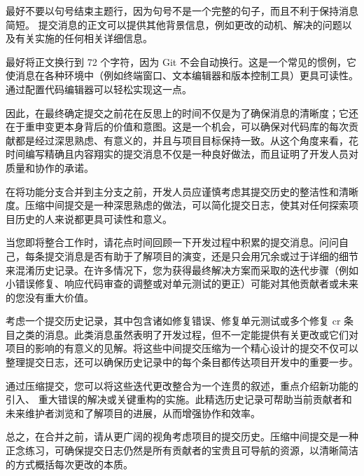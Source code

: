 最好不要以句号结束主题行，因为句号不是一个完整的句子，而且不利于保持消息简短。
提交消息的正文可以提供其他背景信息，例如更改的动机、解决的问题以及有关实施的任何相关详细信息。

最好将正文换行到 72 个字符，因为 Git 不会自动换行。这是一个常见的惯例，它使消息在各种环境中（例如终端窗口、文本编辑器和版本控制工具）更具可读性。通过配置代码编辑器可以轻松实现这一点。

因此，在最终确定提交之前花在反思上的时间不仅是为了确保消息的清晰度；它还在于重申变更本身背后的价值和意图。这是一个机会，可以确保对代码库的每次贡献都是经过深思熟虑、有意义的，并且与项目目标保持一致。从这个角度来看，花时间编写精确且内容翔实的提交消息不仅是一种良好做法，而且证明了开发人员对质量和协作的承诺。


在将功能分支合并到主分支之前，开发人员应谨慎考虑其提交历史的整洁性和清晰度。压缩中间提交是一种深思熟虑的做法，可以简化提交日志，使其对任何探索项目历史的人来说都更具可读性和意义。

当您即将整合工作时，请花点时间回顾一下开发过程中积累的提交消息。问问自己，每条提交消息是否有助于了解项目的演变，还是只会用冗余或过于详细的细节来混淆历史记录。在许多情况下，您为获得最终解决方案而采取的迭代步骤（例如小错误修复、响应代码审查的调整或对单元测试的更正）可能对其他贡献者或未来的您没有重大价值。

考虑一个提交历史记录，其中包含诸如修复错误、修复单元测试或多个修复 cr 条目之类的消息。此类消息虽然表明了开发过程，但不一定能提供有关更改或它们对项目的影响的有意义的见解。将这些中间提交压缩为一个精心设计的提交不仅可以整理提交日志，还可以确保历史记录中的每个条目都传达项目开发中的重要一步。

通过压缩提交，您可以将这些迭代更改整合为一个连贯的叙述，重点介绍新功能的引入、 重大错误的解决或关键重构的实施。此精选历史记录可帮助当前贡献者和未来维护者浏览和了解项目的进展，从而增强协作和效率。

总之，在合并之前，请从更广阔的视角考虑项目的提交历史。压缩中间提交是一种正念练习，可确保提交日志仍然是所有贡献者的宝贵且可导航的资源，以清晰简洁的方式概括每次更改的本质。














